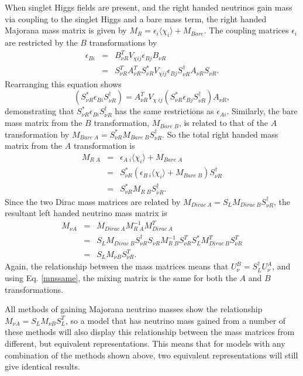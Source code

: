 \documentclass[nofootinbib,showpacs]{revtex4}
\begin{document}
When singlet Higgs fields are present, and the right handed neutrinos gain mass via coupling to the singlet Higgs and a bare mass term, the right handed Majorana mass matrix is given by $M_R=\epsilon_i \langle \chi_i \rangle + M_{Bare}$. 
The coupling matrices $\epsilon_i$ are restricted by the $B$ transformations by
\begin{eqnarray}
\epsilon_{B i}&=&B_{\nu R}^T V_{\chi ij} \epsilon_{B j}B_{\nu R} \\
&=&S_{\nu R}^T A_{\nu R}^T S_{\nu R}^* V_{\chi ij} \epsilon_{B j} S_{\nu R}^\dagger A_{\nu R} S_{\nu R}.  
\end{eqnarray}
Rearranging this equation shows 
\begin{equation}
(S_{\nu R}^* \epsilon_{B i} S_{\nu R}^\dagger)= A_{\nu R}^T V_{\chi\;ij} (S_{\nu R}^* \epsilon_{B j} S_{\nu R}^\dagger) A_{\nu R},
\end{equation}
demonstrating that  $S_{\nu R}^* \epsilon_{B i} S_{\nu R}^\dagger$ has the same restrictions as $\epsilon_{A i}$. 
Similarly, the bare mass matrix from the $B$ transformation, $M_{Bare\; B}$, is related to that of the $A$ transformation by $M_{Bare\; A}=S_{\nu R}^* M_{Bare\;B} S_{\nu R}^\dagger$. So the total right handed mass matrix from the $A$ transformation is 
\begin{eqnarray}
M_{R\;A}&=&\epsilon_{A\;i} \langle \chi_i \rangle + M_{Bare\;A}\\
&=&S_{\nu R}^* (\epsilon_{B\;i} \langle \chi_i \rangle + M_{Bare\;B})S_{\nu R}^\dagger\\
&=&S_{\nu R}^* M_{R\;B} S_{\nu R}^\dagger.
\end{eqnarray}
Since the two Dirac mass matrices are related by $M_{Dirac\: A}=S_L M_{Dirac\: B} S_{\nu R}^\dagger$, the resultant left handed neutrino mass matrix is
\begin{eqnarray}
M_{\nu A}&=&M_{Dirac\: A} M_{R\;A}^{-1}M_{Dirac\: A}^T\\
&=&S_L M_{Dirac\: B} S_{\nu R}^\dagger S_{\nu R} M_{R\;B}^{-1} S_{\nu R}^T S_L^* M_{Dirac\: B}^T S_{\nu R}^T\\
&=&S_L M_{\nu B} S_{\nu R}^T.
\end{eqnarray} 
Again, the relationship between the mass matrices means that $U_{\nu}^B=S_L^\dagger U_{\nu}^A$, and using Eq. \ref{mnssame}, the mixing matrix is the same for both the $A$ and $B$ transformations. 

All methods of gaining Majorana neutrino masses show the relationship $M_{\nu A}=S_L M_{\nu B} S_L^T$, so a model that has neutrino mass gained from a number of these methods will also display this relationship between the mass matrices from different, but equivalent representations. This means that for models with any combination of the methods shown above, two equivalent representations will still give identical results. 
\end{document}
